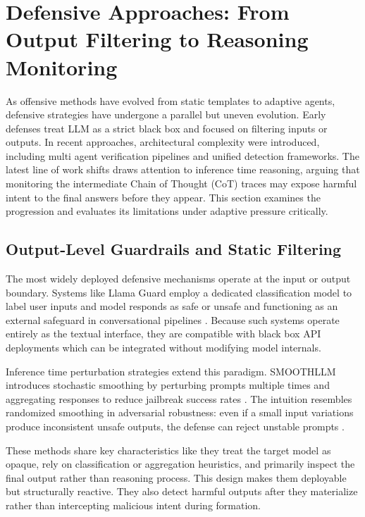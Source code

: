 \documentclass[conference]{IEEEtran}
\begin{document}
\section{Defensive Approaches: From Output Filtering to Reasoning Monitoring}

As offensive methods have evolved from static templates to adaptive agents, defensive strategies have undergone a parallel but uneven evolution. Early defenses treat LLM as a strict black box and focused on filtering inputs or outputs. In recent approaches, architectural complexity were introduced, including multi agent verification pipelines and unified detection frameworks. The latest line of work shifts draws attention to inference time reasoning, arguing that monitoring the intermediate Chain of Thought (CoT) traces may expose harmful intent to the final answers before they appear. This section examines the progression and evaluates its limitations under adaptive pressure critically.

\subsection{Output-Level Guardrails and Static Filtering}

The most widely deployed defensive mechanisms operate at the input or output boundary. Systems like Llama Guard employ a dedicated classification model to label user inputs and model responds as safe or unsafe and functioning as an external safeguard in conversational pipelines \cite{b17}. Because such systems operate entirely as the textual interface, they are compatible with black box API deployments which can be integrated without modifying model internals.

Inference time perturbation strategies extend this paradigm. SMOOTHLLM introduces stochastic smoothing by perturbing prompts multiple times and aggregating responses to reduce jailbreak success rates \cite{b18}. The intuition resembles randomized smoothing in adversarial robustness: even if a small input variations produce inconsistent unsafe outputs, the defense can reject unstable prompts \cite{b18}.

These methods share key characteristics like they treat the target model as opaque, rely on classification or aggregation heuristics, and primarily inspect the final output rather than  reasoning process. This design makes them deployable but structurally reactive. They also detect harmful outputs after they materialize rather than intercepting malicious intent during formation.
\end{document}
